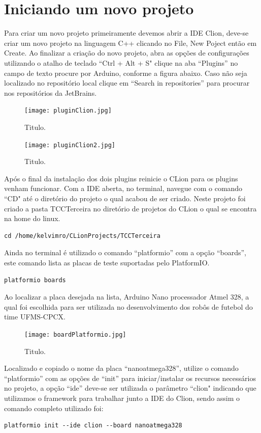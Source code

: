 \documentclass[a4paper,12pt,portuguese]{ufms-cpcx}
\begin{document}
\section{Iniciando um novo projeto}
Para criar um novo projeto primeiramente devemos abrir a IDE Clion, deve-se criar um novo projeto na linguagem C++ clicando no File, New Poject então em Create. Ao finalizar a criação do novo projeto, abra as opções de configurações utilizando o atalho de teclado ``Ctrl + Alt + S" clique na aba ``Plugins” no campo de texto procure por Arduino, conforme a figura abaixo. Caso não seja localizado no repositório local clique em ``Search in repositories” para procurar nos repositórios da JetBrains.
\begin{figure}[H]	
	\centering
	\texttt{[image: pluginClion.jpg]}
	\caption{Titulo.}
\end{figure}
\begin{figure}[H]	
	\centering
	\texttt{[image: pluginClion2.jpg]}
	\caption{Titulo.}
\end{figure}
Após o final da instalação dos dois plugins reinicie o CLion para os plugins venham funcionar. Com a IDE aberta, no terminal, navegue com o comando ``CD" até o diretório do projeto o qual acabou de ser criado. Neste projeto foi criado a pasta TCCTerceira no diretório de projetos do CLion o qual se encontra na home do linux.
\begin{lstlisting}
cd /home/kelvimro/CLionProjects/TCCTerceira
\end{lstlisting}
Ainda no terminal é utilizado o comando ``platformio” com a opção ``boards”, este comando lista as placas de teste suportadas pelo PlatformIO.
\begin{lstlisting}
platformio boards
\end{lstlisting}
Ao localizar a placa desejada na lista, Arduino Nano processador Atmel 328, a qual foi escolhida para ser utilizada no desenvolvimento dos robôs de futebol do time UFMS-CPCX.
\begin{figure}[H]	
	\centering
	\texttt{[image: boardPlatformio.jpg]}
	\caption{Titulo.}
\end{figure}
Localizado e copiado o nome da placa ``nanoatmega328”, utilize o comando ``platformio” com as opções de ``init” para iniciar/instalar os recursos necessários no projeto,  a opção ``ide” deve-se ser utilizada o parâmetro ``clion" indicando que utilizamos o framework para trabalhar junto a IDE do Clion, sendo assim o comando completo utilizado foi:
\begin{lstlisting}
platformio init --ide clion --board nanoatmega328
\end{lstlisting}
\end{document}
